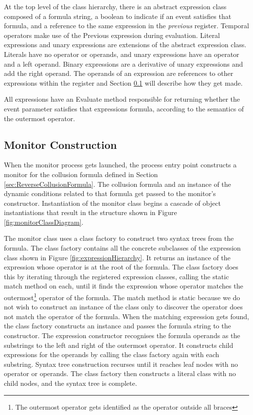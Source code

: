 At the top level of the class hierarchy, there is an abstract expression class composed of a formula string, a boolean to indicate if an event satisfies that formula, and a reference to the same expression in the \textit{previous} register.  Temporal operators make use of the Previous expression during evaluation.  Literal expressions and unary expressions are extensions of the abstract expression class.  Literals have no operator or operands, and unary expressions have an operator and a left operand.  Binary expressions are a derivative of unary expressions and add the right operand.  The operands of an expression are references to other expressions within the register and Section \ref{sec:MonitorConstruction} will describe how they get made.  

All expressions have an Evaluate method responsible for returning whether the event parameter satisfies that expressions formula, according to the semantics of the outermost operator.

\subsection{Monitor Construction}
\label{sec:MonitorConstruction}

When the monitor process gets launched, the process entry point constructs a monitor for the collusion formula defined in Section \ref{sec:ReverseCollusionFormula}.  The collusion formula and an instance of the dynamic conditions related to that formula get passed to the monitor's constructor.  Instantiation of the monitor class begins a cascade of object instantiations that result in the structure shown in Figure \ref{fig:monitorClassDiagram}.

The monitor class uses a class factory to construct two syntax trees from the formula.  The class factory contains all the concrete subclasses of the expression class shown in Figure \ref{fig:expressionHierarchy}.  It returns an instance of the expression whose operator is at the root of the formula.  The class factory does this by iterating through the registered expression classes, calling the static match method on each, until it finds the expression whose operator matches the outermost\footnote{The outermost operator gets identified as the operator outside all braces} operator of the formula.  The match method is static because we do not wish to construct an instance of the class only to discover the operator does not match the operator of the formula.  When the matching expression gets found, the class factory constructs an instance and passes the formula string to the constructor.  The expression constructor recognises the formula operands as the substrings to the left and right of the outermost operator.  It constructs child expressions for the operands by calling the class factory again with each substring.  Syntax tree construction recurses until it reaches leaf nodes with no operator or operands.  The class factory then constructs a literal class with no child nodes, and the syntax tree is complete.


